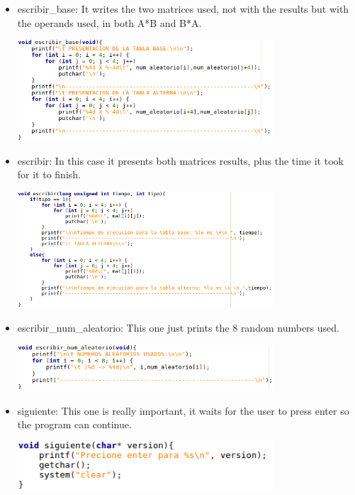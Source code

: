 \documentclass[legalpaper,12pt]{article}
\begin{document}
\begin{itemize}
    \item escribir\_base: It writes the two matrices used, not with the results but with the operands used, in both A*B and B*A.
    \begin{center}{\includegraphics[width=0.75\textwidth]{escribirBase.png}\\[1cm]}\end{center}
    \item escribir: In this case it presents both matrices results, plus the time it took for it to finish.
    \begin{center}{\includegraphics[width=0.75\textwidth]{escribirResp.png}\\[1cm]}\end{center}
    \item escribir\_num\_aleatorio: This one just prints the 8 random numbers used.
    \begin{center}{\includegraphics[width=0.75\textwidth]{escribirRand.png}\\[1cm]}\end{center}
    \item siguiente: This one is really important, it waits for the user to press enter so the program can continue.
    \begin{center}{\includegraphics[width=0.75\textwidth]{siguiente.png}\\[1cm]}\end{center}

\end{itemize}
\end{document}
